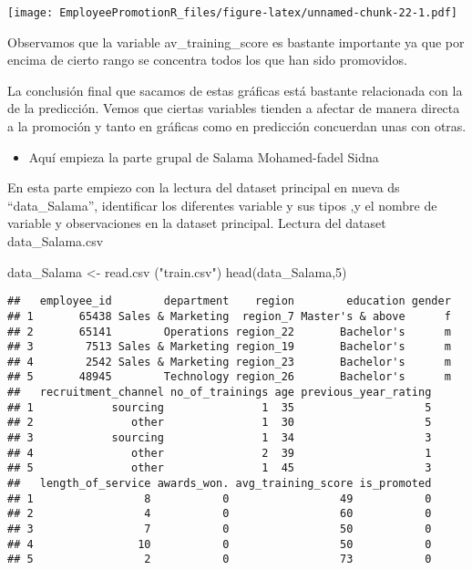\documentclass[
]{article}
\newenvironment{Shaded}{\begin{snugshade}}{\end{snugshade}}
\newcommand{\DecValTok}[1]{\textcolor[rgb]{0.00,0.00,0.81}{#1}}
\newcommand{\FunctionTok}[1]{\textcolor[rgb]{0.00,0.00,0.00}{#1}}
\newcommand{\NormalTok}[1]{#1}
\newcommand{\OtherTok}[1]{\textcolor[rgb]{0.56,0.35,0.01}{#1}}
\newcommand{\StringTok}[1]{\textcolor[rgb]{0.31,0.60,0.02}{#1}}
\providecommand{\tightlist}{%
  \setlength{\itemsep}{0pt}\setlength{\parskip}{0pt}}
\begin{document}
\texttt{[image: EmployeePromotionR\_files/figure-latex/unnamed-chunk-22-1.pdf]}

Observamos que la variable av\_training\_score es bastante importante ya
que por encima de cierto rango se concentra todos los que han sido
promovidos.

La conclusión final que sacamos de estas gráficas está bastante
relacionada con la de la predicción. Vemos que ciertas variables tienden
a afectar de manera directa a la promoción y tanto en gráficas como en
predicción concuerdan unas con otras.

\begin{itemize}
\tightlist
\item
  Aquí empieza la parte grupal de Salama Mohamed-fadel Sidna
\end{itemize}

En esta parte empiezo con la lectura del dataset principal en nueva ds
``data\_Salama'', identificar los diferentes variable y sus tipos ,y el
nombre de variable y observaciones en la dataset principal. Lectura del
dataset data\_Salama.csv

\begin{Shaded}
\begin{Highlighting}[]
\NormalTok{data\_Salama }\OtherTok{\textless{}{-}} \FunctionTok{read.csv}\NormalTok{ (}\StringTok{"train.csv"}\NormalTok{)}
\FunctionTok{head}\NormalTok{(data\_Salama,}\DecValTok{5}\NormalTok{)}
\end{Highlighting}
\end{Shaded}

\begin{verbatim}
##   employee_id        department    region        education gender
## 1       65438 Sales & Marketing  region_7 Master's & above      f
## 2       65141        Operations region_22       Bachelor's      m
## 3        7513 Sales & Marketing region_19       Bachelor's      m
## 4        2542 Sales & Marketing region_23       Bachelor's      m
## 5       48945        Technology region_26       Bachelor's      m
##   recruitment_channel no_of_trainings age previous_year_rating
## 1            sourcing               1  35                    5
## 2               other               1  30                    5
## 3            sourcing               1  34                    3
## 4               other               2  39                    1
## 5               other               1  45                    3
##   length_of_service awards_won. avg_training_score is_promoted
## 1                 8           0                 49           0
## 2                 4           0                 60           0
## 3                 7           0                 50           0
## 4                10           0                 50           0
## 5                 2           0                 73           0
\end{verbatim}
\end{document}

